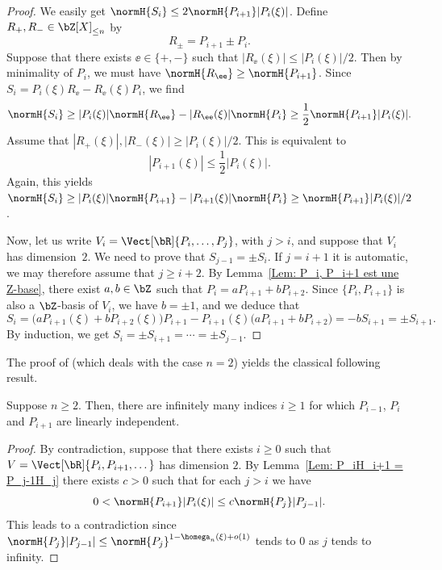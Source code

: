 \begin{proof}
We easily get $\normH{S_i} \leq 2\normH{P_{i+1}}|P_i(\xi)|$. Define $R_+, R_- \in\bZ[X]_{\leq n}$ by
\[
R_\pm = P_{i+1} \pm P_i.
\]
Suppose that there exists $\ee\in\{+,-\}$ such that $|R_\ee(\xi)| \leq |P_i(\xi)|/2$. Then by minimality of $P_i$, we must have $\normH{R_\ee} \geq \normH{P_{i+1}}$. Since $S_i = P_i(\xi)R_\ee - R_\ee(\xi) P_i$, we find
\begin{equation*}
\normH{S_i} \geq |P_i(\xi)|\normH{R_\ee} - |R_\ee(\xi)|\normH{P_i} \geq \frac{1}{2} \normH{P_{i+1}}|P_i(\xi)|.
\end{equation*}
Assume that $|R_+(\xi)|, |R_-(\xi)| \geq |P_i(\xi)|/2$. This is equivalent to
\[
|P_{i+1}(\xi)| \leq \frac{1}{2}|P_i(\xi)|.
\]
Again, this yields $\normH{S_i} \geq |P_i(\xi)|\normH{P_{i+1}} - |P_{i+1}(\xi)|\normH{P_i} \geq \normH{P_{i+1}}|P_i(\xi)|/2$.

Now, let us write $V_i = \Vect[\bR]{P_i,\dots,P_j}$, with $j > i$, and suppose that $V_i$ has dimension~$2$. We need to prove that $S_{j-1} = \pm S_i$. If $j=i+1$ it is automatic, we may therefore assume that $j\geq i+2$. By Lemma~\ref{Lem: P_i, P_i+1 est une Z-base}, there exist $a,b\in\bZ$ such that $P_i = aP_{i+1} + bP_{i+2}$. Since $\{P_i,P_{i+1}\}$ is also a $\bZ$-basis of $V_i$, we have $b=\pm 1$, and we deduce that
\[
S_i = \big(aP_{i+1}(\xi) + bP_{i+2}(\xi)\big)P_{i+1} - P_{i+1}(\xi)\big(aP_{i+1} + bP_{i+2}\big) = -bS_{i+1} = \pm S_{i+1}.
\]
By induction, we get $S_i = \pm S_{i+1} = \cdots = \pm S_{j-1}$.
\end{proof}

The proof of \cite[Lem.\,3]{davenport1967approximation} (which deals with the case $n=2$) yields the classical following result.

\begin{Lem}
\label{lem: I infini}
Suppose $n\geq 2$. Then, there are infinitely many indices $i\geq 1$ for which $P_{i-1}$, $P_i$ and $P_{i+1}$ are linearly independent.
\end{Lem}

\begin{proof}
By contradiction, suppose that there exists $i\geq 0$ such that $V=\Vect[\bR]{P_i,P_{i+1},\dots}$ has dimension $2$. By Lemma~\ref{Lem: P_iH_i+1 = P_j-1H_j} there exists $c>0$ such that for each $j > i$ we have
\[
0 < \normH{P_{i+1}}|P_i(\xi)| \leq c\normH{P_j}|P_{j-1}|.
\]
This leads to a contradiction since $\normH{P_j}|P_{j-1}| \leq \normH{P_j}^{1-\homega_n(\xi)+o(1)}$ tends to $0$ as $j$ tends to infinity.
\end{proof}

